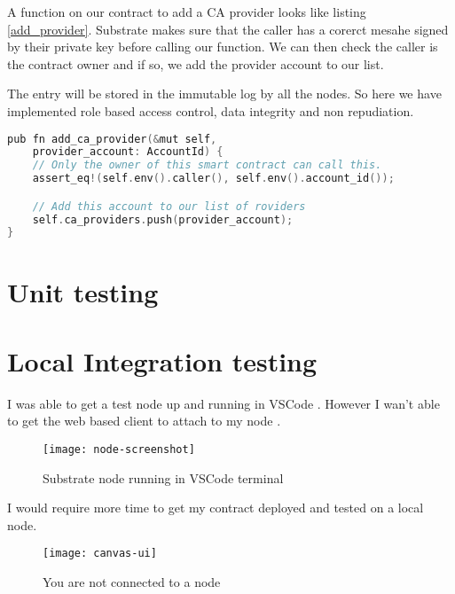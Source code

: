 A function on our contract to add a CA provider looks like listing \ref{add_provider}. 
Substrate makes sure that the caller has a corerct mesahe signed by their private key before calling our function. 
We can then check the caller is the contract owner and if so, we add the provider account to our list.

The entry will be stored in the immutable log by all the nodes. So here we have implemented role based access control, 
data integrity and non repudiation. 


\begin{lstlisting}[label={add_provider},language=c,caption={Add a provider}]
pub fn add_ca_provider(&mut self, 
    provider_account: AccountId) {
    // Only the owner of this smart contract can call this.
    assert_eq!(self.env().caller(), self.env().account_id());

    // Add this account to our list of roviders
    self.ca_providers.push(provider_account);
}
\end{lstlisting}

\section{Unit testing}

\section{Local Integration testing}

I was able to get a test node up and running in VSCode \pageref{node}. 
However I wan't able to get the web based client to attach to my node \pageref{canvas}.

\begin{figure}[h]
    \texttt{[image: node-screenshot]} 
    \caption{Substrate node running in VSCode terminal}
    \label{node}
\end{figure}

I would require more time to get my contract deployed and tested on a local node.

\begin{figure}[h]
    \texttt{[image: canvas-ui]} 
    \caption{You are not connected to a node}
    \label{canvas}
\end{figure}